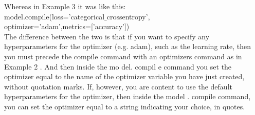Whereas in Example 3 it was like this:\\
model.compile(loss='categorical$\_$crossentropy',\\
optimizer='adam',metrics=['accuracy'])\\

The difference between the two is that if you want to specify any hyperparameters for the optimizer (e.g. adam), such as the learning rate, then you must precede the compile command with an optimizers command as in Example 2 . And then inside the mo del. compil e command you set the optimizer equal to the name of the optimizer variable you have just created, without quotation marks. If, however, you are content to use the default hyperparameters for the optimizer, then inside the model . compile command, you can set the optimizer equal to a string indicating your choice, in quotes.
